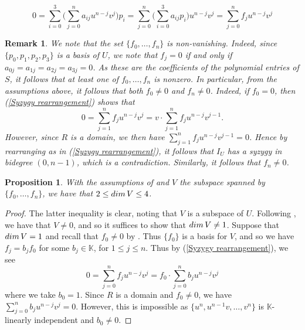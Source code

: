 \documentclass[10pt,a4paper]{amsart}
\newtheorem{rem}{Remark}
\newtheorem{prop}{Proposition}
\def\K{\mathbb{K}}
\def\dim{\mathop{\rm dim}}
\begin{document}
\begin{equation}\label{Syzygy rearrangement}
    0=\sum_{i=0}^3 \big(\sum_{j=0}^n a_{ij} u^{n-j}v^j\big) p_i = \sum_{j=0}^n \big( \sum_{i=0}^3 a_{ij} p_i\big) u^{n-j}v^j= \sum_{j=0}^n f_j u^{n-j}v^j
\end{equation}

\begin{rem}\label{f0 and fn nonzero}
We note that the set $\{f_0,\ldots,f_n\}$ is non-vanishing. Indeed, since $\{p_0,p_1,p_2,p_3\}$ is a basis of $U$, we note that $f_j =0$ if and only if $a_{0j} = a_{1j} = a_{2j} = a_{3j}=0$. As these are the coefficients of the polynomial entries of $S$, it follows that at least one of $f_0,\ldots,f_n$ is nonzero. In particular, from the assumptions above, it follows that both $f_0 \neq 0$ and $f_n \neq 0$. Indeed, if $f_0 =0$, then (\ref{Syzygy rearrangement}) shows that 
$$0=\sum_{j=1}^n f_j u^{n-j}v^j = v\cdot\sum_{j=1}^n f_j u^{n-j}v^{j-1}.$$
However, since $R$ is a domain, we then have $\sum_{j=1}^n f_j u^{n-j}v^{j-1} =0$. Hence by rearranging as in (\ref{Syzygy rearrangement}), it follows that $I_U$ has a syzygy in bidegree $(0,n-1)$, which is a contradiction. Similarly, it follows that $f_n\neq 0$.
\end{rem}

\begin{prop}\label{Dimension of V}
With the assumptions of  and $V$ the subspace spanned by $\{f_0,\ldots,f_n\}$, we have that $2\leq \dim V\leq 4$.
\end{prop}

\begin{proof}
The latter inequality is clear, noting that $V$ is a subspace of $U$. Following , we have that $V \neq 0$, and so it suffices to show that $\dim V \neq 1$. Suppose that $\dim V =1$ and recall that $f_0 \neq 0$ by . Thus $\{f_0\}$ is a basis for $V$, and so we have $f_j = b_jf_0$ for some $b_j \in \K$, for $1\leq j\leq n$. Thus by (\ref{Syzygy rearrangement}), we see
$$0=\sum_{j=0}^n f_j u^{n-j}v^j = f_0 \cdot \sum_{j=0}^n b_j u^{n-j}v^j$$
where we take $b_0 =1$. Since $R$ is a domain and $f_0 \neq 0$, we have $\sum_{j=0}^n b_j u^{n-j}v^j=0$. However, this is impossible as $\{u^n,u^{n-1}v,\ldots,v^n\}$ is $\K$-linearly independent and $b_0\neq 0$. 
\end{proof}
\end{document}
